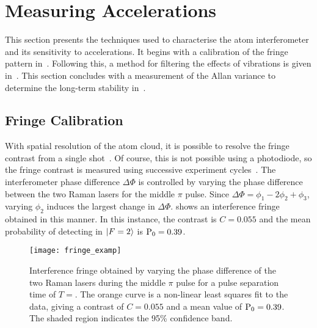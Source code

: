 \section{Measuring Accelerations}\label{sec:atomint_accelerations}
This section presents the techniques used to characterise the atom interferometer
and its sensitivity to accelerations. It begins with a calibration of
the fringe pattern in~. Following this, a
method for filtering the effects of vibrations is given
in~. This section concludes with
a measurement of the Allan variance to determine the long-term
stability in~.
\subsection{Fringe Calibration}\label{sec:fringe_cal}
With spatial resolution of the atom cloud, it is possible to resolve
the fringe contrast from a single shot~\cite{Sugarbaker2013}. Of
course, this is not possible using a photodiode, so the fringe
contrast is measured using successive experiment
cycles~\cite{Peters2001}. 
The interferometer phase difference $\Delta \Phi$ is controlled 
by varying the phase difference between the two Raman lasers for the
middle \(\pi\) pulse. Since \(\Delta \Phi = \phi_1 - 2\phi_2
+\phi_3\), varying \(\phi_2\) induces the largest change in
\(\Delta\Phi\).  shows an interference fringe obtained in this
manner. In this instance, the contrast is \(C = 0.055\) and the mean
probability of detecting in \(\ket{F=2}\) is \(\textnormal{P}_0 =
0.39\).
\begin{figure}[htpb!]
  \centering
  \texttt{[image: fringe\_examp]}
  \caption[Interference fringe for \(T = \).]{Interference fringe obtained by varying the phase
    difference of the two Raman lasers during the middle \(\pi\) pulse
    for a pulse separation time of \(T = \). The orange
curve is a non-linear least squares fit to the data, giving a contrast
of \(C = 0.055\) and a mean value of \(\textnormal{P}_0 = 0.39\). The
shaded region indicates the 95\% confidence band. }
  \label{fig:fringe_examp}
\end{figure}

